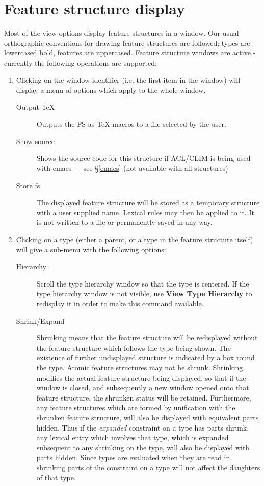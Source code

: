 \documentclass[12pt]{report}
\begin{document}
\section{Feature structure display}
\label{activefs}

Most of the view options display feature structures in a window.  
Our usual orthographic conventions for
drawing feature structures are followed; types are lowercased bold,
features are uppercased.  Feature structure windows
are active - currently the following operations are supported:
\begin{enumerate}
\item Clicking on the window identifier (i.e. the first item in the
window) will display a menu of options which apply to the whole
window.
\begin{description}
\item [Output TeX] Outputs the FS as TeX macros to a file selected by
the user.  
\item [Show source] Shows the source code for this structure 
if ACL/CLIM is being used with emacs --- see \S\ref{emacs}
(not available with all structures)
\item [Store fs] The displayed feature structure will be stored as a
temporary structure with a user supplied name.  Lexical rules may then be
applied to it.
It is not written to a file or permanently saved in
any way.
\end{description}
\item Clicking on a type (either a parent, or a type in the feature
structure itself) will give a sub-menu with the following options:
\begin{description}
\item[Hierarchy] Scroll the type hierarchy window so
that the type is centered.  If the type hierarchy window is not visible,
use {\bf View Type Hierarchy} to redisplay it in order to make
this command available.
\item[Shrink/Expand] 
Shrinking means that the feature structure will be redisplayed without
the feature structure which follows the type being shown.  The
existence of further undisplayed structure is indicated by a box round
the type.  Atomic feature structures may not be shrunk.  Shrinking
modifies the actual feature structure being displayed, so that if the
window is closed, and subsequently a new window opened onto that
feature structure, the shrunken status will be retained.  Furthermore,
any feature structures which are formed by unification with the
shrunken feature structure, will also be displayed with equivalent
parts hidden.  Thus if the {\em expanded} constraint on a type has
parts shrunk, any lexical entry which involves that type, which is
expanded subsequent to any shrinking on the type, will also be
displayed with parts hidden.  Since types are evaluated when they are
read in, shrinking parts of the constraint on a type will not affect
the daughters of that type.


\end{description}
\end{enumerate}
\end{document}
